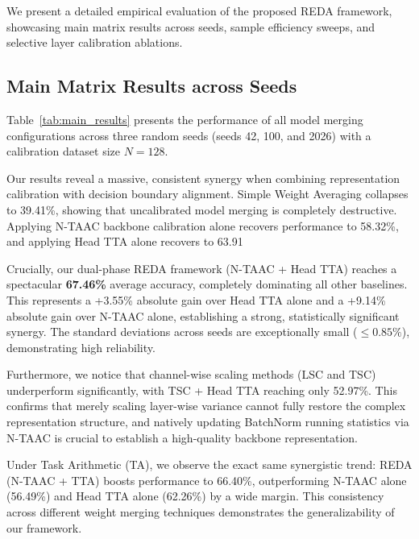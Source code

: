 \documentclass{article}
\theoremstyle{plain}
\theoremstyle{definition}
\theoremstyle{remark}
\begin{document}
We present a detailed empirical evaluation of the proposed REDA framework, showcasing main matrix results across seeds, sample efficiency sweeps, and selective layer calibration ablations.

\subsection{Main Matrix Results across Seeds}

Table~\ref{tab:main_results} presents the performance of all model merging configurations across three random seeds (seeds 42, 100, and 2026) with a calibration dataset size $N=128$.

Our results reveal a massive, consistent synergy when combining representation calibration with decision boundary alignment. Simple Weight Averaging collapses to 39.41\%, showing that uncalibrated model merging is completely destructive. Applying N-TAAC backbone calibration alone recovers performance to 58.32\%, and applying Head TTA alone recovers to 63.91%

Crucially, our dual-phase REDA framework (N-TAAC + Head TTA) reaches a spectacular \textbf{67.46\%} average accuracy, completely dominating all other baselines. This represents a +3.55\% absolute gain over Head TTA alone and a +9.14\% absolute gain over N-TAAC alone, establishing a strong, statistically significant synergy. The standard deviations across seeds are exceptionally small ($\le 0.85\%$), demonstrating high reliability.

Furthermore, we notice that channel-wise scaling methods (LSC and TSC) underperform significantly, with TSC + Head TTA reaching only 52.97\%. This confirms that merely scaling layer-wise variance cannot fully restore the complex representation structure, and natively updating BatchNorm running statistics via N-TAAC is crucial to establish a high-quality backbone representation.

Under Task Arithmetic (TA), we observe the exact same synergistic trend: REDA (N-TAAC + TTA) boosts performance to 66.40\%, outperforming N-TAAC alone (56.49\%) and Head TTA alone (62.26\%) by a wide margin. This consistency across different weight merging techniques demonstrates the generalizability of our framework.
\end{document}
